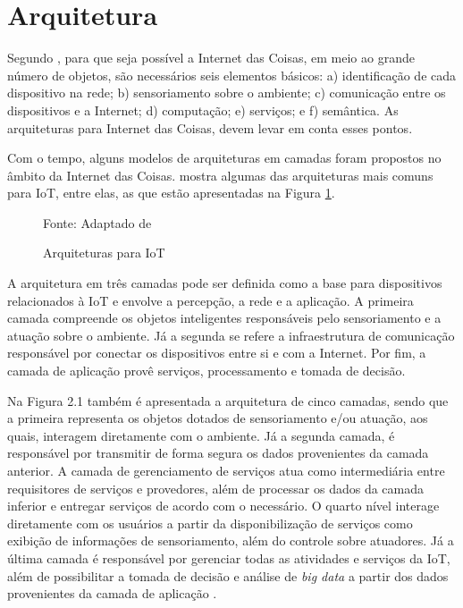 \section{Arquitetura}

Segundo , para que seja possível a Internet das Coisas, em meio ao grande número de objetos, são necessários seis elementos básicos: a) identificação de cada dispositivo na rede; b) sensoriamento sobre o ambiente; c) comunicação entre os dispositivos e a Internet; d) computação; e) serviços; e f) semântica. As arquiteturas para Internet das Coisas, devem levar em conta esses pontos.

Com o tempo, alguns modelos de arquiteturas em camadas foram propostos no âmbito da Internet das Coisas.  mostra algumas das arquiteturas mais comuns para IoT, entre elas, as que estão apresentadas na Figura \ref{fig:cap2_arquiteturas}.
\begin{figure}[htb]
	\caption{Arquiteturas para IoT}

	\footnotesize{Fonte: Adaptado de }
	\label{fig:cap2_arquiteturas}
\end{figure}

A arquitetura em três camadas pode ser definida como a base para dispositivos relacionados à IoT e envolve a  percepção, a rede e a aplicação. A primeira camada compreende os objetos inteligentes responsáveis pelo sensoriamento e a atuação sobre o ambiente. Já a segunda se refere a infraestrutura de comunicação responsável por conectar os dispositivos entre si e com a Internet. Por fim, a camada de aplicação provê serviços, processamento e tomada de decisão.  


Na Figura 2.1 também é apresentada a arquitetura de cinco camadas, sendo que a primeira representa os objetos dotados de sensoriamento e/ou atuação, aos quais, interagem diretamente com o ambiente. Já a segunda camada, é responsável por transmitir de forma segura os dados provenientes da camada anterior. A camada de gerenciamento de serviços atua como intermediária entre requisitores de serviços e provedores, além de processar os dados da camada inferior e entregar  serviços de acordo com o necessário. O quarto nível interage diretamente com os usuários a partir da disponibilização de serviços como exibição de informações de sensoriamento, além do controle sobre atuadores. Já a última camada é responsável por gerenciar todas as atividades e serviços da IoT, além de possibilitar a tomada de decisão e análise de \textit{big data} a partir dos dados provenientes da camada de aplicação \cite{Al-Fuqaha2015}.

